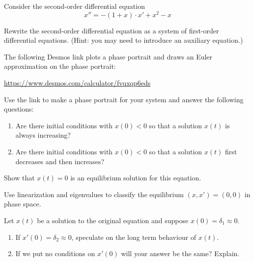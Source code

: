 \documentclass{workbook}
\begin{document}
\begin{slide}
	\question
	Consider the second-order differential equation
	\[
		x''=-(1+x)\cdot x'+x^2-x
	\]

	\begin{parts}
		\item Rewrite the second-order differential equation as a system of first-order differential equations. (Hint:
		you may need to introduce an auxiliary equation.)

		\item The following Desmos link plots a phase portrait and draws an Euler approximation on the phase portrait:

		{\small \url{https://www.desmos.com/calculator/fvqxqp6eds}}

		Use the link to make a phase portrait for your system and answer the following questions:
		\begin{enumerate}
			\item Are there initial conditions with $x(0)<0$ so that a solution $x(t)$ is always increasing?
			\item Are there initial conditions with $x(0)<0$ so that a solution $x(t)$ first decreases and then increases?
		\end{enumerate}

		\item Show that $x(t)=0$ is an equilibrium solution for this equation.

		\item Use linearization and eigenvalues to classify the equilibrium $(x,x')=(0,0)$
		in phase space.

		\item Let $x(t)$ be a solution to the original equation and suppose $x(0)=\delta_1\approx 0$.
		\begin{enumerate}
			\item If $x'(0)=\delta_2\approx 0$, speculate on the long term behaviour of $x(t)$.
			\item If we put no conditions on $x'(0)$ will your answer be the same? Explain.
		\end{enumerate}

	\end{parts}
\end{slide}
\end{document}
